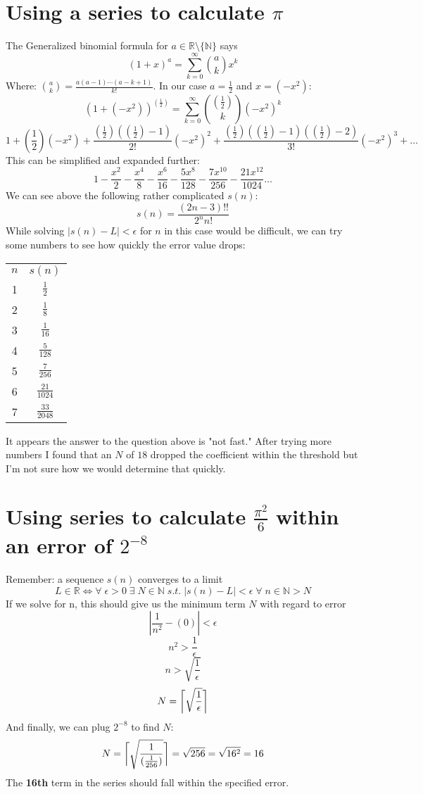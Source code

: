 \documentclass{article}
\DeclarePairedDelimiter{\ceil}{\lceil}{\rceil}
\begin{document}
\section{Using a series to calculate $\pi$}
The Generalized binomial formula for $a\in \mathbb R\setminus \{\mathbb N\}$ says
\[(1+x)^a= \sum_{k=0}^{\infty}{a\choose k} x^k\]
Where: ${{a\choose k} =\frac{a(a-1)\cdots(a-k+1)}{k!}}$. In our case $a=\frac{1}{2}$ and $x=(-x^2)$:
\[(1+(-x^2))^{(\frac{1}{2})}= \sum_{k=0}^{\infty}{(\frac{1}{2})\choose k} (-x^2)^k\]
\[1+\left(\frac{1}{2}\right)\left(-x^2\right)+\frac{\left(\frac{1}{2}\right)\left(\left(\frac{1}{2}\right)-1\right)}{2!}\left(-x^2\right)^2+\frac{\left(\frac{1}{2}\right)\left(\left(\frac{1}{2}\right)-1\right)\left(\left(\frac{1}{2}\right)-2\right)}{3!}\left(-x^2\right)^3+\dots\]
This can be simplified and expanded further:
\[1-\frac{x^2}{2}-\frac{x^4}{8}-\frac{x^6}{16}-\frac{5x^8}{128}-\frac{7x^{10}}{256}-\frac{21x^{12}}{1024}\dots\]
We can see above the following rather complicated $s(n)$:
\[s(n) = \frac{\left(2n-3\right)!!}{2^nn!}\]
While solving $\left|s(n) - L\right| < \epsilon$ for $n$ in this case would be difficult, we can try some numbers to see how quickly the error value drops:
\begin{center}
    \begin{tabular}{|| c | c ||}
        \hline
        $n$ & $s(n)$            \\ [0.5ex]
        1   & $\frac{1}{2}$     \\
        2   & $\frac{1}{8}$     \\
        3   & $\frac{1}{16}$    \\
        4   & $\frac{5}{128}$   \\
        5   & $\frac{7}{256}$   \\
        6   & $\frac{21}{1024}$ \\
        7   & $\frac{33}{2048}$ \\
        [1ex]
        \hline
    \end{tabular}
\end{center}
It appears the answer to the question above is "not fast." After trying more numbers I found that an $N$ of $18$ dropped the coefficient within the threshold but I'm not sure how we would determine that quickly.

\section{Using series to calculate $\frac{\pi^2}{6}$ within an error of $2^{-8}$}
Remember: a sequence $s(n)$ converges to a limit
\[L \in\mathbb{R}\iff\forall \; \epsilon > 0  \; \exists \; N \in \mathbb{N} \; s.t. \; |s(n) - L| < \epsilon \; \forall \; n \in \mathbb{N} > N\]
If we solve for n, this should give us the minimum term $N$ with regard to error %
\[ |\frac{1}{n^2} - (0)| < \epsilon\]
\[n^2>\frac{1}{\epsilon}\]
\[n>\sqrt{\frac{1}{\epsilon}}\]
\[N=\ceil[\bigg]{\sqrt{\frac{1}{\epsilon}}}\]
And finally, we can plug $2^{-8}$ to find $N$:
\[N=\ceil[\bigg]{\sqrt{\frac{1}{(\frac{1}{256})}}}=\sqrt{256}=\sqrt{16^2}=16\]
The \textbf{16th} term in the series should fall within the specified error.
\end{document}
